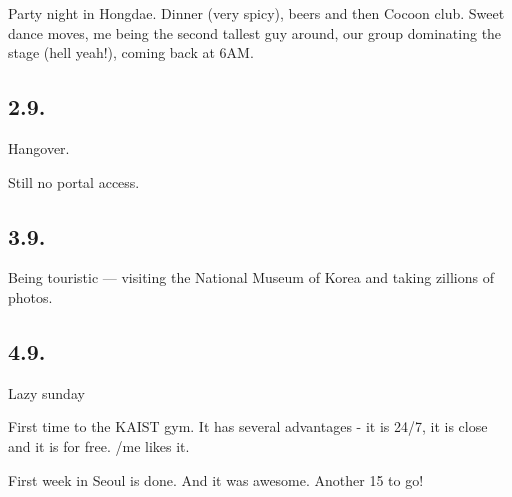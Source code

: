 \begin{post}
\begin{content}
\begin{itemize*}
	\item Party night in Hongdae. Dinner (very spicy), beers and then Cocoon club. Sweet dance moves, me being the second tallest guy around, our group dominating the stage (hell yeah!), coming back at 6AM.

\end{itemize*}



\subsection{2.9.}



\begin{itemize*}

	\item Hangover.

	\item Still no portal access.

\end{itemize*}



\subsection{3.9.}



\begin{itemize*}

	\item Being touristic — visiting the National Museum of Korea and taking zillions of photos.

\end{itemize*}

\subsection{4.9.}



\begin{itemize*}

	\item Lazy sunday

	\item First time to the KAIST gym. It has several advantages - it is 24/7, it is close and it is for free. /me likes it.

	\item First week in Seoul is done. And it was awesome. Another 15 to go!

\end{itemize*}




	\end{content}
\end{post}
